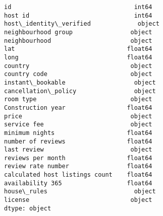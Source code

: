 \documentclass[11pt]{article}
\makeatletter
\newcommand{\boxspacing}{\kern\kvtcb@left@rule\kern\kvtcb@boxsep}
\newcommand{\prompt}[4]{
        {\ttfamily\llap{{\color{#2}[#3]:\hspace{3pt}#4}}\vspace{-\baselineskip}}
    }
\makeatother
\begin{document}
            \begin{tcolorbox}[breakable, size=fbox, boxrule=.5pt, pad at break*=1mm, opacityfill=0]
\prompt{Out}{outcolor}{ }{\boxspacing}
\begin{Verbatim}[commandchars=\\\{\}]
id                                  int64
host id                             int64
host\_identity\_verified             object
neighbourhood group                object
neighbourhood                      object
lat                               float64
long                              float64
country                            object
country code                       object
instant\_bookable                   object
cancellation\_policy                object
room type                          object
Construction year                 float64
price                              object
service fee                        object
minimum nights                    float64
number of reviews                 float64
last review                        object
reviews per month                 float64
review rate number                float64
calculated host listings count    float64
availability 365                  float64
house\_rules                        object
license                            object
dtype: object
\end{Verbatim}
\end{tcolorbox}
        
\end{document}
